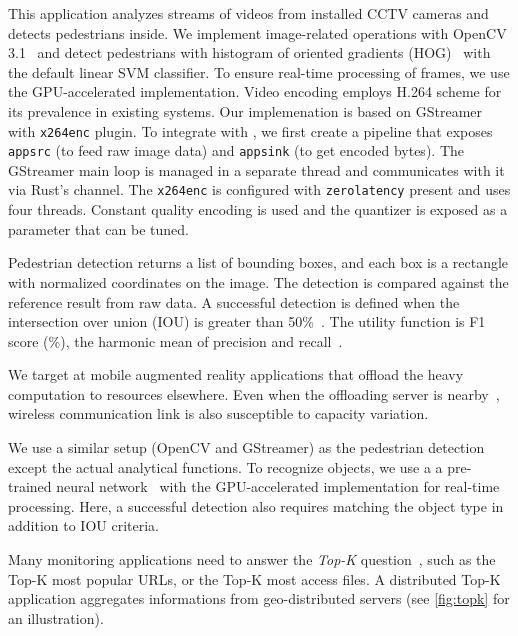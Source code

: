  This application analyzes streams of videos from
installed CCTV cameras and detects pedestrians inside. We implement
image-related operations with OpenCV 3.1~\cite{opencvlibrary} and detect
pedestrians with histogram of oriented gradients
(HOG)~\cite{dalal2005histograms} with the default linear SVM classifier. To
ensure real-time processing of frames, we use the GPU-accelerated
implementation. Video encoding employs H.264 scheme for its prevalence in
existing systems. Our implemenation is based on GStreamer~\cite{gstreamer} with
\texttt{x264enc} plugin. To integrate with \sysname{}, we first create a
pipeline that exposes \texttt{appsrc} (to feed raw image data) and
\texttt{appsink} (to get encoded bytes). The GStreamer main loop is managed in a
separate thread and \sysname{} communicates with it via Rust's channel. The
\texttt{x264enc} is configured with \texttt{zerolatency} present and uses four
threads. Constant quality encoding is used and the quantizer is exposed as a
parameter that can be tuned.

Pedestrian detection returns a list of bounding boxes, and each box is a
rectangle with normalized coordinates on the image. The detection is compared
against the reference result from raw data. A successful detection is defined
when the intersection over union (IOU) is greater than
50\%~\cite{everingham2010pascal}. The utility function is F1 score (\%), the
harmonic mean of precision and recall~\cite{Rijsbergen:1979:IR:539927}.

 We target at mobile augmented reality applications
that offload the heavy computation to resources elsewhere. Even when the
offloading server is nearby~\cite{satyanarayanan2009case, zhang2015cloud},
wireless communication link is also susceptible to capacity variation.

We use a similar setup (OpenCV and GStreamer) as the pedestrian detection except
the actual analytical functions. To recognize objects, we use a a pre-trained
neural network~\cite{darknet13, redmon2016yolo9000} with the GPU-accelerated
implementation for real-time processing. Here, a successful detection also
requires matching the object type in addition to IOU criteria.

 Many monitoring applications need to answer the
\textit{Top-K} question~\cite{babcock2003distributed}, such as the Top-K most
popular URLs, or the Top-K most access files. A distributed Top-K application
aggregates informations from geo-distributed servers (see \autoref{fig:topk} for
an illustration).

